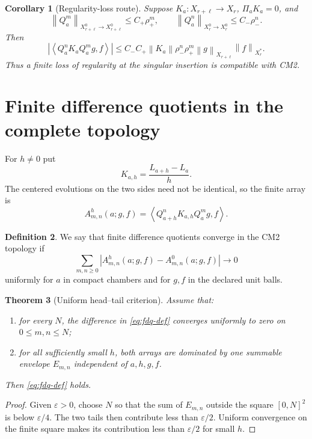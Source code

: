 \documentclass[11pt,reqno]{amsart}
\newtheorem{theorem}{Theorem}[section]
\newtheorem{corollary}[theorem]{Corollary}
\theoremstyle{definition}
\newtheorem{definition}[theorem]{Definition}
\theoremstyle{remark}
\newcommand{\norm}[1]{\left\lVert #1\right\rVert}
\newcommand{\abs}[1]{\left\lvert #1\right\rvert}
\newcommand{\pair}[2]{\left\langle #1,#2\right\rangle}
\begin{document}
\begin{corollary}[Regularity-loss route]\label{cor:loss-route}
Suppose $K_a:X_{r+\ell}\to X_r$, $\Pi_aK_a=0$, and
\[
 \norm{Q_a^m}_{X_{r+\ell}^0\to X_{r+\ell}^0}
 \le C_+\rho_+^m,
 \qquad
 \norm{Q_a^n}_{X_r^0\to X_r^0}
 \le C_-\rho_-^n.
\]
Then
\[
 \abs{\pair{Q_a^nK_aQ_a^m g}{f}}
 \le C_-C_+\norm{K_a}\rho_-^n\rho_+^m
 \norm{g}_{X_{r+\ell}}\norm{f}_{X_r^*}.
\]
Thus a finite loss of regularity at the singular insertion is compatible with
CM2.
\end{corollary}

\section{Finite difference quotients in the complete topology}\label{sec:fdq}

For $h\ne0$ put
\[
 K_{a,h}=\frac{L_{a+h}-L_a}{h}.
\]
The centered evolutions on the two sides need not be identical, so the finite
array is
\[
 A_{m,n}^{h}(a;g,f)=
 \pair{Q_{a+h}^nK_{a,h}Q_a^m g}{f}.
\]

\begin{definition}
We say that finite difference quotients converge in the CM2 topology if
\begin{equation}\label{eq:fdq-def}
 \sum_{m,n\ge0}
 \abs{A_{m,n}^{h}(a;g,f)-A_{m,n}^{0}(a;g,f)}\longrightarrow0
\end{equation}
uniformly for $a$ in compact chambers and for $g,f$ in the declared unit
balls.
\end{definition}

\begin{theorem}[Uniform head--tail criterion]\label{thm:fdq}
Assume that:
\begin{enumerate}[label=\textup{(\roman*)}]
\item for every $N$, the difference in \eqref{eq:fdq-def} converges uniformly
to zero on $0\le m,n\le N$;
\item for all sufficiently small $h$, both arrays are dominated by one
summable envelope $E_{m,n}$ independent of $a,h,g,f$.
\end{enumerate}
Then \eqref{eq:fdq-def} holds.
\end{theorem}

\begin{proof}
Given $\varepsilon>0$, choose $N$ so that the sum of $E_{m,n}$ outside the
square $[0,N]^2$ is below $\varepsilon/4$.  The two tails then contribute less
than $\varepsilon/2$.  Uniform convergence on the finite square makes its
contribution less than $\varepsilon/2$ for small $h$.
\end{proof}
\end{document}
